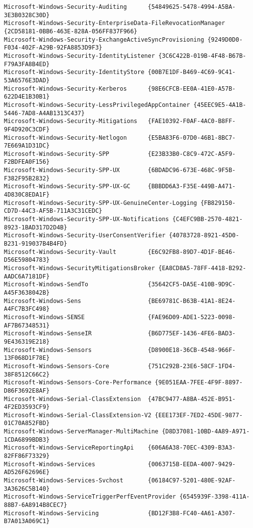 \documentclass{report}
\begin{document}
\begin{lstlisting}[breaklines=true,basicstyle=\tiny]
Microsoft-Windows-Security-Auditing      {54849625-5478-4994-A5BA-3E3B0328C30D}
Microsoft-Windows-Security-EnterpriseData-FileRevocationManager {2CD58181-0BB6-463E-828A-056FF837F966}
Microsoft-Windows-Security-ExchangeActiveSyncProvisioning {9249D0D0-F034-402F-A29B-92FA8853D9F3}
Microsoft-Windows-Security-IdentityListener {3C6C422B-019B-4F48-B67B-F79A3FA8B4ED}
Microsoft-Windows-Security-IdentityStore {00B7E1DF-B469-4C69-9C41-53A6576E3DAD}
Microsoft-Windows-Security-Kerberos      {98E6CFCB-EE0A-41E0-A57B-622D4E1B30B1}
Microsoft-Windows-Security-LessPrivilegedAppContainer {45EEC9E5-4A1B-5446-7AD8-A4AB1313C437}
Microsoft-Windows-Security-Mitigations   {FAE10392-F0AF-4AC0-B8FF-9F4D920C3CDF}
Microsoft-Windows-Security-Netlogon      {E5BA83F6-07D0-46B1-8BC7-7E669A1D31DC}
Microsoft-Windows-Security-SPP           {E23B33B0-C8C9-472C-A5F9-F2BDFEA0F156}
Microsoft-Windows-Security-SPP-UX        {6BDADC96-673E-468C-9F5B-F382F95B2832}
Microsoft-Windows-Security-SPP-UX-GC     {BBBDD6A3-F35E-449B-A471-4D830C8EDA1F}
Microsoft-Windows-Security-SPP-UX-GenuineCenter-Logging {FB829150-CD7D-44C3-AF5B-711A3C31CEDC}
Microsoft-Windows-Security-SPP-UX-Notifications {C4EFC9BB-2570-4821-8923-1BAD317D2D4B}
Microsoft-Windows-Security-UserConsentVerifier {40783728-8921-45D0-B231-919037B4B4FD}
Microsoft-Windows-Security-Vault         {E6C92FB8-89D7-4D1F-BE46-D56E59804783}
Microsoft-Windows-SecurityMitigationsBroker {EA8CD8A5-78FF-4418-B292-AADC6A7181DF}
Microsoft-Windows-SendTo                 {35642CF5-DA5E-410B-9D9C-A45F3638042B}
Microsoft-Windows-Sens                   {BE69781C-B63B-41A1-8E24-A4FC7B3FC498}
Microsoft-Windows-SENSE                  {FAE96D09-ADE1-5223-0098-AF7B67348531}
Microsoft-Windows-SenseIR                {B6D775EF-1436-4FE6-BAD3-9E436319E218}
Microsoft-Windows-Sensors                {D8900E18-36CB-4548-966F-13F068D1F78E}
Microsoft-Windows-Sensors-Core           {751C292B-23E6-58CF-1FD4-38F8512C66C2}
Microsoft-Windows-Sensors-Core-Performance {9E051EAA-7FEE-4F9F-8897-D86F3692E8AF}
Microsoft-Windows-Serial-ClassExtension  {47BC9477-A8BA-452E-B951-4F2ED3593CF9}
Microsoft-Windows-Serial-ClassExtension-V2 {EEE173EF-7ED2-45DE-9877-01C70A852FBD}
Microsoft-Windows-ServerManager-MultiMachine {D8D37081-10BD-4A89-A971-1CDA6899BDB3}
Microsoft-Windows-ServiceReportingApi    {606A6A38-70EC-4309-B3A3-82FF86F73329}
Microsoft-Windows-Services               {0063715B-EEDA-4007-9429-AD526F62696E}
Microsoft-Windows-Services-Svchost       {06184C97-5201-480E-92AF-3A3626C5B140}
Microsoft-Windows-ServiceTriggerPerfEventProvider {6545939F-3398-411A-88B7-6A8914B8CEC7}
Microsoft-Windows-Servicing              {BD12F3B8-FC40-4A61-A307-B7A013A069C1}

\end{lstlisting}
\end{document}
